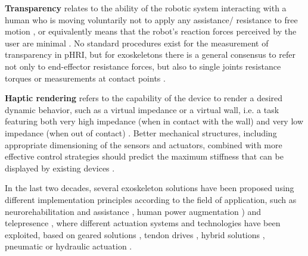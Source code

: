 \noindent
\setlength{\IEEEiednormlabelsep}{-2 \parindent}
\begin{IEEEdescription}
	\item[{\bf Transparency }] \hspace{2 cm}
	 relates to the ability of the
	robotic system interacting with a human who is moving
	voluntarily
	not to apply any assistance/
	resistance to free motion
	\cite{jarrasse2010methodology},
	or equivalently means that the robot’s
	reaction forces perceived by the user are minimal \cite{just2018exoskeleton}.
	No standard procedures exist for the measurement of transparency in pHRI, but for exoskeletons there is a general consensus  to refer not only to end-effector resistance forces, but also to single joints resistance torques or measurements at contact points \cite{just2018exoskeleton}.
	\item[{\bf Haptic rendering} ] %
	 \hspace{2.7 cm}
	  refers to the capability of the device to render a desired dynamic behavior, such as a virtual impedance  or a virtual wall, i.e. a
	task featuring both very high impedance (when in contact
	with the wall) and very low impedance (when out of
	contact) \cite{colgate1994factors}. Better mechanical structures,
	including appropriate dimensioning of the sensors and
	actuators, combined with more effective
	control strategies  should predict the maximum
	stiffness that can be displayed by existing devices   \cite{diolaiti2005criterion}.
\end{IEEEdescription}


In the last two decades, several exoskeleton solutions have been proposed using different implementation principles according to the field of application, such as  neurorehabilitation and assistance \cite{lo2012exoskeleton,pirondini2016evaluation,xiloyannis2019physiological}, human power augmentation \cite{kim2016powered}) and telepresence \cite{buongiorno2018wres, rebelo2014bilateral,buongiorno_chiaradia_marcheschi_solazzi_frisoli_2019}, where different actuation systems and technologies have been exploited, based on geared solutions \cite{mihelj2007armin,vertechy2009development,carignan2005design}, tendon drives \cite{frisoli2009force,perry2007upper}, hybrid solutions \cite{garrec2008able,onTheEdgeTiseni19}, pneumatic or hydraulic  actuation \cite{tsagarakis2003development,klein2010optimization}.

